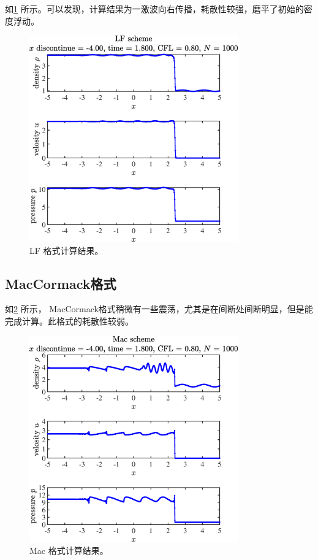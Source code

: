 \documentclass[12pt]{article}
\begin{document}
如\cref{fig:4LF} 所示。可以发现，计算结果为一激波向右传播，耗散性较强，磨平了初始的密度浮动。
\begin{figure}[htp]
	\centering
	\includegraphics[width=9cm]{4LF.eps}
	\vspace{20pt}
	\caption{LF 格式计算结果。}
	\label{fig:4LF}
\end{figure}


\subsection{MacCormack格式}


如\cref{fig:4Mac} 所示， MacCormack格式稍微有一些震荡，尤其是在间断处间断明显，但是能完成计算。此格式的耗散性较弱。

\begin{figure}[htp]
	\centering
	\includegraphics[width=9cm]{4Mac.eps}
	\vspace{20pt}
	\caption{Mac 格式计算结果。}
	\label{fig:4Mac}
\end{figure}
\end{document}
